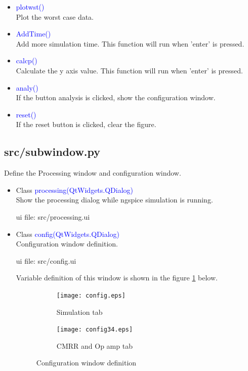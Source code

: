\documentclass[12pt,a4paper]{article}
\begin{document}
\begin{itemize}[leftmargin=*]
\begin{itemize}
    \item \textcolor{blue}{plotwst()}\\
        Plot the worst case data.

    \item \textcolor{blue}{AddTime()}\\
        Add more simulation time. This function will run when 'enter' is pressed.

    \item \textcolor{blue}{calcp()}\\
        Calculate the y axis value. This function will run when 'enter' is pressed.

    \item \textcolor{blue}{analy()}\\
        If the button analysis is clicked, show the configuration window.

    \item \textcolor{blue}{reset()}\\
        If the reset button is clicked, clear the figure.

\end{itemize}

\subsection{src/\textunderscore subwindow.py}
Define the Processing window and configuration window.

\begin{itemize}
    \item Class \textcolor{blue}{processing(QtWidgets.QDialog)}\\
        Show the processing dialog while ngspice simulation is running.

        ui file: src/processing.ui

    \item Class \textcolor{blue}{config(QtWidgets.QDialog)}\\
        Configuration window definition.

        ui file: src/config.ui

        Variable definition of this window is shown in the figure \ref{Config} below.
        \begin{figure}[ht]
            \centering
            \begin{subfigure}[b]{0.9\textwidth}
                \centering
                \texttt{[image: config.eps]}
                \caption{Simulation tab}\vspace{1ex}
            \end{subfigure}
            \begin{subfigure}[b]{0.9\textwidth}
                \centering
                \texttt{[image: config34.eps]}
                \caption{CMRR and Op amp tab}\vspace{1ex}
            \end{subfigure}
            \caption{Configuration window definition}
            \label{Config}
        \end{figure}


\end{itemize}
\end{itemize}
\end{document}
